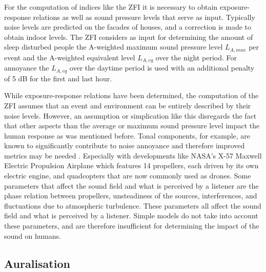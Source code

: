 For the computation of indices like the ZFI it is necessary to obtain
exposure-response relations as well as sound pressure levels that serve as
input. Typically noise levels are predicted on the facades of houses, and a
correction is made to obtain indoor levels. The ZFI considers as input for
determining the amount of sleep disturbed people the A-weighted maximum sound
pressure level $L_{A,max}$ per event and the A-weighted equivalent level
$L_{A,eq}$ over the night period. For annoyance the $L_{A,eq}$ over the daytime
period is used with an additional penalty of 5 dB for the first and last hour.

While exposure-response relations have been determined, the computation of the
ZFI assumes that an event and environment can be entirely described by their
noise levels. However, an assumption or simplication like this disregards the
fact that other aspects than the average or maximum sound pressure level impact
the human response as was mentioned before. Tonal components, for example, are
known to significantly contribute to noise annoyance and therefore improved
metrics may be needed \cite{Sahai2016,Sahai2016b}. Especially with developments
like NASA's X-57 Maxwell Electric Propulsion Airplane
\cite{Moore2012,Beutel2016} which features 14 propellers, each driven by its own
electric engine, and quadcopters \cite{Rizzi2015} that are now commonly used as
drones. Some parameters that affect the sound field and what is perceived by a
listener are the phase relation between propellers, unsteadiness of the sources,
interferences, and fluctuations due to atmospheric turbulence. These parameters
all affect the sound field and what is perceived by a listener. Simple models do
not take into account these parameters, and are therefore insufficient for
determining the impact of the sound on humans.




\subsection*{Auralisation}\label{sec:introduction:background:auralisation}%

